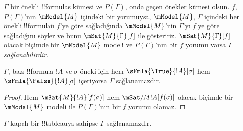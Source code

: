 \begin{defn}
  $\Gamma$ bir önekli !!{formula}s kümesi ve $P(\Gamma)$, onda geçen önekler
  kümesi olsun. $f$, $P(\Gamma)$'nın $\mModel{M}$ içindeki bir yorumuysa,
  $\mModel{M}$, $\Gamma$ içindeki her önekli !!{formula}{}ü $f$'ye göre
  sağladığında $\mModel{M}$'nin $\Gamma$'yı $f$'ye göre sağladığını söyler ve bunu
  $\mSat{M}{\Gamma}[f]$ ile gösteririz. $\mSat{M}{\Gamma}[f]$ olacak biçimde
  bir $\mModel{M}$ modeli ve $P(\Gamma)$'nın bir $f$ yorumu varsa $\Gamma$
  \emph{sağlanabilirdir}.
\end{defn}

\begin{prop}
  $\Gamma$, bazı !!{formula} $!A$ ve $\sigma$ öneki için hem
  $\sFmla{\True}{!A}[\sigma]$ hem $\sFmla{\False}{!A}[\sigma]$ içeriyorsa
  $\Gamma$ sağlanamazdır.
\end{prop}

\begin{proof}
  Hem $\mSat{M}{!A}[f(\sigma)]$ hem $\mSat/{M}{!A}[f(\sigma)]$ olacak
  biçimde bir $\mModel{M}$ modeli ile $P(\Gamma)$'nın bir $f$ yorumu olamaz.
\end{proof}

\begin{thm}[Sağlamlık]
  $\Gamma$ kapalı bir !!{tableau}{}ya sahipse $\Gamma$ sağlanamazdır.
\end{thm}


